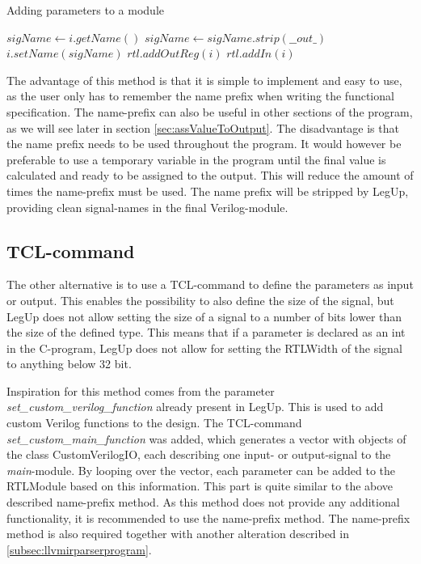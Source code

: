 \begin{algorithm}
  \caption{\label{alg:addInOut}Adding parameters to a module}
  \begin{algorithmic}[1]
    \Statex
    \State $sigName \gets i.getName()$
      \State $sigName \gets sigName.strip(\_\_out\_)$
      \State $i.setName(sigName)$
      \State $rtl.addOutReg(i)$
    \Else
      \State $rtl.addIn(i)$
    \EndIf
  \end{algorithmic}
\end{algorithm}

The advantage of this method is that it is simple to implement and easy to use, as the user only has to remember the name prefix when writing the functional specification. The name-prefix can also be useful in other sections of the program, as we will see later in section \ref{sec:assValueToOutput}. The disadvantage is that the name prefix needs to be used throughout the program. It would however be preferable to use a temporary variable in the program until the final value is calculated and ready to be assigned to the output. This will reduce the amount of times the name-prefix must be used. The name prefix will be stripped by LegUp, providing clean signal-names in the final Verilog-module.
\subsection{\label{subsubsec:inoutparameter}TCL-command}
The other alternative is to use a TCL-command to define the parameters as input or output. This enables the possibility to also define the size of the signal, but LegUp does not allow setting the size of a signal to a number of bits lower than the size of the defined type. This means that if a parameter is declared as an int in the C-program, LegUp does not allow for setting the RTLWidth of the signal to anything below 32 bit.

Inspiration for this method comes from the parameter \textit{set\_custom\_verilog\_function} already present in LegUp. This is used to add custom Verilog functions to the design. The TCL-command \textit{set\_custom\_main\_function} was added, which generates a vector with objects of the class CustomVerilogIO, each describing one input- or output-signal to the \textit{main}-module. By looping over the vector, each parameter can be added to the RTLModule based on this information. This part is quite similar to the above described name-prefix method. As this method does not provide any additional functionality, it is recommended to use the name-prefix method. The name-prefix method is also required together with another alteration described in \cref{subsec:llvmirparserprogram}.

